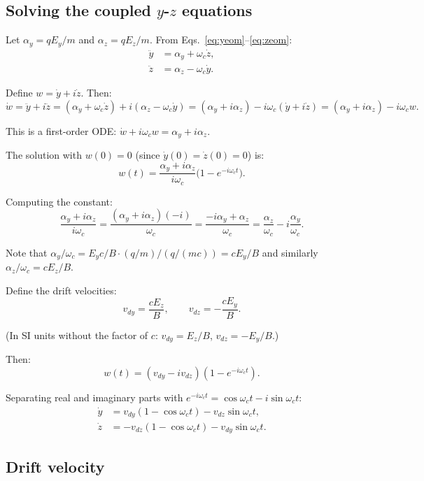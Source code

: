 \documentclass[12pt]{article}
\begin{document}
\subsection*{Solving the coupled $y$-$z$ equations}

Let $\alpha_y = qE_y/m$ and $\alpha_z = qE_z/m$. From Eqs.~\eqref{eq:yeom}--\eqref{eq:zeom}:
\begin{align}
\ddot{y} &= \alpha_y + \omega_c \dot{z}, \label{eq:y2} \\
\ddot{z} &= \alpha_z - \omega_c \dot{y}. \label{eq:z2}
\end{align}

Define $w = \dot{y} + i\dot{z}$. Then:
\[
\dot{w} = \ddot{y} + i\ddot{z} = (\alpha_y + \omega_c \dot{z}) + i(\alpha_z - \omega_c \dot{y})
= (\alpha_y + i\alpha_z) - i\omega_c(\dot{y} + i\dot{z})
= (\alpha_y + i\alpha_z) - i\omega_c w.
\]

This is a first-order ODE: $\dot{w} + i\omega_c w = \alpha_y + i\alpha_z$.

The solution with $w(0) = 0$ (since $\dot{y}(0) = \dot{z}(0) = 0$) is:
\[
w(t) = \frac{\alpha_y + i\alpha_z}{i\omega_c}\bigl(1 - e^{-i\omega_c t}\bigr).
\]

Computing the constant:
\[
\frac{\alpha_y + i\alpha_z}{i\omega_c} = \frac{(\alpha_y + i\alpha_z)(-i)}{{\omega_c}} = \frac{-i\alpha_y + \alpha_z}{\omega_c} = \frac{\alpha_z}{\omega_c} - i\frac{\alpha_y}{\omega_c}.
\]

Note that $\alpha_y/\omega_c = E_y c/B \cdot (q/m)/(q/(mc)) = cE_y/B$ and similarly $\alpha_z/\omega_c = cE_z/B$.

Define the drift velocities:
\[
v_{dy} = \frac{cE_z}{B}, \qquad v_{dz} = -\frac{cE_y}{B}.
\]

(In SI units without the factor of $c$: $v_{dy} = E_z/B$, $v_{dz} = -E_y/B$.)

Then:
\[
w(t) = (v_{dy} - iv_{dz})(1 - e^{-i\omega_c t}).
\]

Separating real and imaginary parts with $e^{-i\omega_c t} = \cos\omega_c t - i\sin\omega_c t$:
\begin{align}
\dot{y} &= v_{dy}(1-\cos\omega_c t) - v_{dz}\sin\omega_c t, \\
\dot{z} &= -v_{dz}(1-\cos\omega_c t) - v_{dy}\sin\omega_c t.
\end{align}

\subsection*{Drift velocity}
\end{document}
